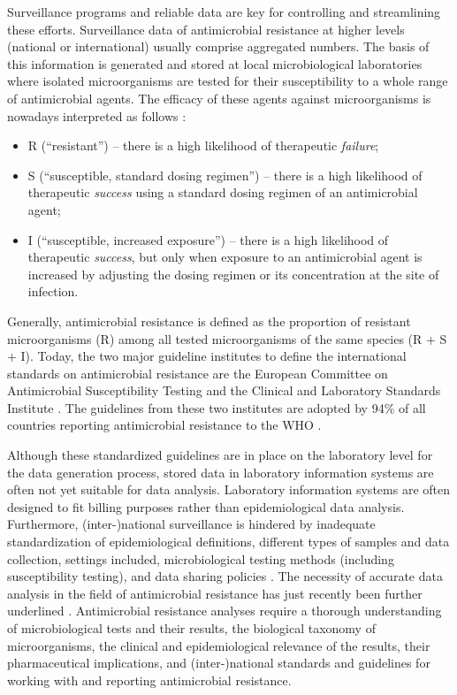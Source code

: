 \documentclass[article, shortnames]{jss}
\begin{document}
Surveillance programs and reliable data are key for controlling and
streamlining these efforts.  Surveillance data of antimicrobial resistance
at higher levels (national or international) usually comprise aggregated
numbers.  The basis of this information is generated and stored at local
microbiological laboratories where isolated microorganisms are tested for
their susceptibility to a whole range of antimicrobial agents.  The efficacy
of these agents against microorganisms is nowadays interpreted as follows
\citep{eucast_newRSI}:
%
\begin{itemize}
  \item{R (``resistant'') -- there is a high likelihood of therapeutic \emph{failure};}
  \item{S  (``susceptible, standard dosing regimen'') -- there is a high
likelihood of therapeutic \emph{success} using a standard dosing regimen of
an antimicrobial agent;}
  \item{I (``susceptible, increased exposure'') -- there is a high likelihood
of therapeutic \emph{success}, but only when exposure to an antimicrobial
agent is increased by adjusting the dosing regimen or its concentration at
the site of infection.}
\end{itemize}
%
Generally, antimicrobial resistance is defined as the proportion of
resistant microorganisms (R) among all tested microorganisms of the same
species (R + S + I).  Today, the two major guideline institutes to define
the international standards on antimicrobial resistance are the European
Committee on Antimicrobial Susceptibility Testing
\citep[EUCAST,][]{Leclercq2013-ml} and the Clinical and Laboratory Standards Institute
\citep[CLSI,][]{Clinical_and_Laboratory_Standards_Institute2014-fb}.  The
guidelines from these two institutes are adopted by 94\% of all countries
reporting antimicrobial resistance to the WHO
\citep{World_Health_Organization2018-bn}.

Although these standardized guidelines are in place on the laboratory level
for the data generation process, stored data in laboratory information
systems are often not yet suitable for data analysis.  Laboratory
information systems are often designed to fit billing purposes rather than
epidemiological data analysis.  Furthermore, (inter-)national surveillance
is hindered by inadequate standardization of epidemiological definitions,
different types of samples and data collection, settings included,
microbiological testing methods (including susceptibility testing), and data
sharing policies \citep{Tacconelli2018-tb}.  The necessity of accurate data
analysis in the field of antimicrobial resistance has just recently been
further underlined \citep{Limmathurotsakul2019}.  Antimicrobial resistance
analyses require a thorough understanding of microbiological tests and their
results, the biological taxonomy of microorganisms, the clinical and
epidemiological relevance of the results, their pharmaceutical implications,
and (inter-)national standards and guidelines for working with and reporting
antimicrobial resistance.
\end{document}
